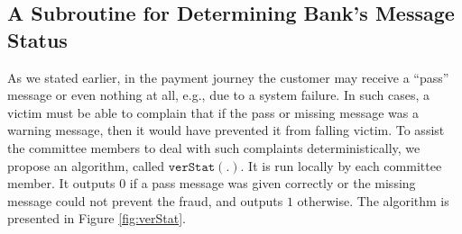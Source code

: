 

\subsection{A Subroutine for Determining Bank's Message Status}

As we stated earlier, in the payment journey the customer may receive a ``pass'' message or even nothing at all, e.g., due to a system failure. In such cases,  a victim  must be able to complain that if the pass or missing message was   a warning message, then it   would have prevented it  from falling victim. To assist the committee members to deal with  such complaints deterministically, we propose an algorithm,  called $\mathtt{verStat}(.)$. It is run locally by each committee member. It outputs $0$ if a pass message was given correctly or the missing message could not  prevent the fraud, and outputs $1$ otherwise. The algorithm is presented in Figure \ref{fig:verStat}.


